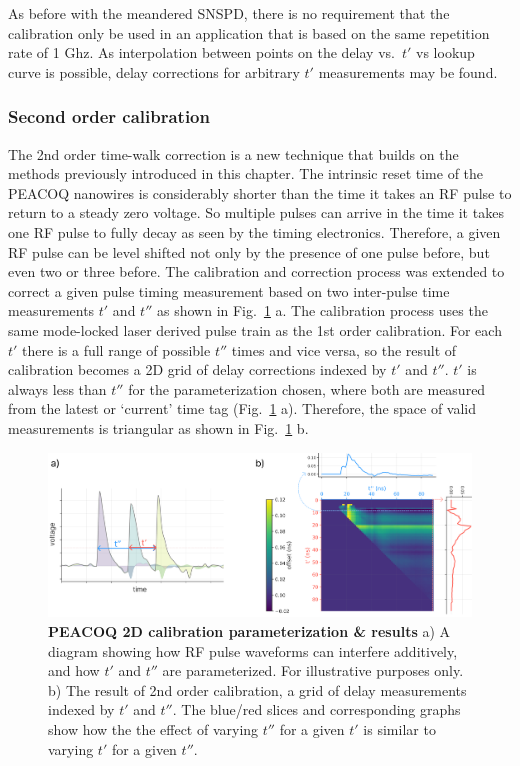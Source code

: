 \documentclass[11pt]{caltech_thesis} %
\begin{document}
As before with the meandered SNSPD, there is no requirement that the calibration only be used in an application that is based on the same repetition rate of 1 Ghz. As interpolation between points on the delay vs.~$t'$ vs lookup curve is possible, delay corrections for arbitrary $t'$ measurements may be found.

\hypertarget{second-order-calibration}{%
\subsubsection{Second order calibration}\label{second-order-calibration}}

The 2nd order time-walk correction is a new technique that builds on the methods previously introduced in this chapter. The intrinsic reset time of the PEACOQ nanowires is considerably shorter than the time it takes an RF pulse to return to a steady zero voltage. So multiple pulses can arrive in the time it takes one RF pulse to fully decay as seen by the timing electronics. Therefore, a given RF pulse can be level shifted not only by the presence of one pulse before, but even two or three before. The calibration and correction process was extended to correct a given pulse timing measurement based on two inter-pulse time measurements $t'$ and $t''$ as shown in Fig.~\ref{fig:order_2nd} a. The calibration process uses the same mode-locked laser derived pulse train as the 1st order calibration. For each $t'$ there is a full range of possible $t''$ times and vice versa, so the result of calibration becomes a 2D grid of delay corrections indexed by $t'$ and $t''$. $t'$ is always less than $t''$ for the parameterization chosen, where both are measured from the latest or `current' time tag (Fig.~\ref{fig:order_2nd} a). Therefore, the space of valid measurements is triangular as shown in Fig.~\ref{fig:order_2nd} b.

\hypertarget{fig:order_2nd}{%
\begin{figure}
\centering
\includegraphics[width=1\textwidth,height=\textheight]{./chapter_03/figs/SOM_Figure_order_2nd_v1_light.pdf}
\caption[{PEACOQ 2D calibration parameterization \& results}]{\textbf{PEACOQ 2D calibration parameterization \& results} a) A diagram showing how RF pulse waveforms can interfere additively, and how $t'$ and $t''$ are parameterized. For illustrative purposes only. b) The result of 2nd order calibration, a grid of delay measurements indexed by $t'$ and $t''$. The blue/red slices and corresponding graphs show how the the effect of varying $t''$ for a given $t'$ is similar to varying $t'$ for a given $t''$.}
\label{fig:order_2nd}
\end{figure}
}
\end{document}
